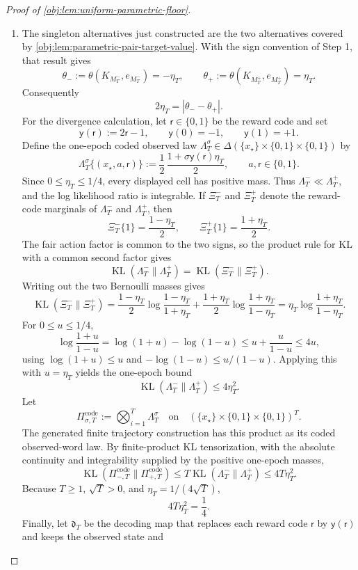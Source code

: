 \documentclass[11pt]{article}
\begin{document}
\begin{proof}[Proof of \cref{obj:lem:uniform-parametric-floor}]
\begin{enumerate}
\item The singleton alternatives just constructed are the two alternatives covered
by \cref{obj:lem:parametric-pair-target-value}.  With the sign convention of
Step 1, that result gives
\[
\theta_-
:=\theta(K_{M_T^-},e_{M_T^-})
=-\eta_T,
\qquad
\theta_+
:=\theta(K_{M_T^+},e_{M_T^+})
=\eta_T.
\]
Consequently
\[
2\eta_T
=
|\theta_{-}-\theta_{+}|.
\]
For the divergence calculation, let \(\mathsf r\in\{0,1\}\) be the reward code
and set
\[
\mathsf y(\mathsf r):=2\mathsf r-1,
\qquad
\mathsf y(0)=-1,
\qquad
\mathsf y(1)=+1.
\]
Define the one-epoch coded observed law
\(\Lambda_T^\sigma\in\Delta(\{x_\star\}\times\{0,1\}\times\{0,1\})\) by
\[
\Lambda_T^\sigma\{(x_\star,a,\mathsf r)\}
:=
\frac12\,\frac{1+\sigma\mathsf y(\mathsf r)\eta_T}{2},
\qquad a,\mathsf r\in\{0,1\}.
\]
Since \(0\le\eta_T\le1/4\), every displayed cell has positive mass.  Thus
\(\Lambda_T^-\ll\Lambda_T^+\), and the log likelihood ratio is integrable.  If
\(\Xi_T^-\) and \(\Xi_T^+\) denote the reward-code marginals of
\(\Lambda_T^-\) and \(\Lambda_T^+\), then
\[
\Xi_T^-\{1\}=\frac{1-\eta_T}{2},
\qquad
\Xi_T^+\{1\}=\frac{1+\eta_T}{2}.
\]
The fair action factor is common to the two signs, so the product rule for KL
with a common second factor gives
\[
\operatorname{KL}(\Lambda_T^-\|\Lambda_T^+)
=
\operatorname{KL}(\Xi_T^-\|\Xi_T^+).
\]
Writing out the two Bernoulli masses gives
\[
\operatorname{KL}(\Xi_T^-\|\Xi_T^+)
=
\frac{1-\eta_T}{2}\log\frac{1-\eta_T}{1+\eta_T}
+
\frac{1+\eta_T}{2}\log\frac{1+\eta_T}{1-\eta_T}
=
\eta_T\log\frac{1+\eta_T}{1-\eta_T}.
\]
For \(0\le u\le1/4\),
\[
\log\frac{1+u}{1-u}
=
\log(1+u)-\log(1-u)
\le
u+\frac{u}{1-u}
\le 4u,
\]
using \(\log(1+u)\le u\) and \(-\log(1-u)\le u/(1-u)\).  Applying this with
\(u=\eta_T\) yields the one-epoch bound
\[
\operatorname{KL}(\Lambda_T^-\|\Lambda_T^+)
\le 4\eta_T^2.
\]
Let
\[
\Pi_{\sigma,T}^{\mathrm{code}}
:=
\bigotimes_{i=1}^T\Lambda_T^\sigma
\quad\text{on}\quad
(\{x_\star\}\times\{0,1\}\times\{0,1\})^T.
\]
The generated finite trajectory construction has this product as its coded
observed-word law.  By finite-product KL tensorization, with the absolute
continuity and integrability supplied by the positive one-epoch masses,
\[
\operatorname{KL}(\Pi_{-,T}^{\mathrm{code}}\|
\Pi_{+,T}^{\mathrm{code}})
\le
T\operatorname{KL}(\Lambda_T^-\|\Lambda_T^+)
\le
4T\eta_T^2.
\]
Because \(T\ge1\), \(\sqrt T>0\), and \(\eta_T=1/(4\sqrt T)\),
\[
4T\eta_T^2=\frac14.
\]
Finally, let \(\mathfrak d_T\) be the decoding map that replaces each reward
code \(\mathsf r\) by \(\mathsf y(\mathsf r)\) and keeps the observed state and

\end{enumerate}
\end{proof}
\end{document}
